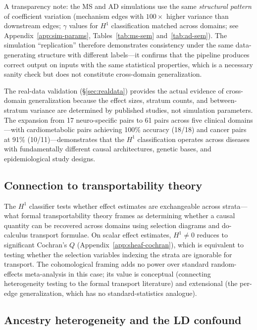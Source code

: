 \documentclass[11pt]{article}
\begin{document}
A transparency note: the MS and AD simulations use the same \emph{structural pattern} of coefficient variation (mechanism edges with $100\times$ higher variance than downstream edges; $\gamma$ values for $H^1$ classification matched across domains; see Appendix~\ref{app:sim-params}, Tables~\ref{tab:ms-sem} and~\ref{tab:ad-sem}).
The simulation ``replication'' therefore demonstrates consistency under the same data-generating structure with different labels---it confirms that the pipeline produces correct output on inputs with the same statistical properties, which is a necessary sanity check but does not constitute cross-domain generalization.

The real-data validation (\S\ref{sec:realdata}) provides the actual evidence of cross-domain generalization because the effect sizes, stratum counts, and between-stratum variance are determined by published studies, not simulation parameters.
The expansion from 17 neuro-specific pairs to 61 pairs across five clinical domains---with cardiometabolic pairs achieving 100\% accuracy (18/18) and cancer pairs at 91\% (10/11)---demonstrates that the $H^1$ classification operates across diseases with fundamentally different causal architectures, genetic bases, and epidemiological study designs.

\subsection{Connection to transportability theory}

The $H^1$ classifier tests whether effect estimates are exchangeable across strata---what formal transportability theory frames as determining whether a causal quantity can be recovered across domains using selection diagrams and do-calculus transport formulae.
On scalar effect estimates, $H^1 \neq 0$ reduces to significant Cochran's $Q$ (Appendix~\ref{app:sheaf-cochran}), which is equivalent to testing whether the selection variables indexing the strata are ignorable for transport.
The cohomological framing adds no power over standard random-effects meta-analysis in this case; its value is conceptual (connecting heterogeneity testing to the formal transport literature) and extensional (the per-edge generalization, which has no standard-statistics analogue).

\subsection{Ancestry heterogeneity and the LD confound}
\label{sec:ld-confound}
\end{document}
